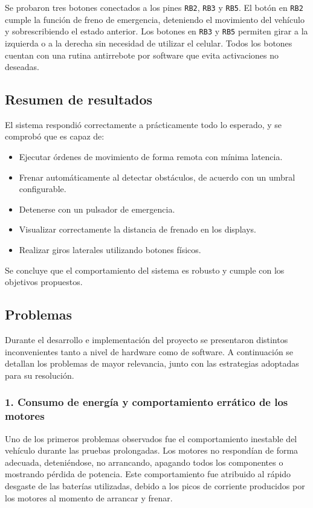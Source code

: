 \documentclass[]{article}
\begin{document}
	Se probaron tres botones conectados a los pines \texttt{RB2}, \texttt{RB3} y \texttt{RB5}. El botón en \texttt{RB2} cumple la función de freno de emergencia, deteniendo el movimiento del vehículo y sobrescribiendo el estado anterior. Los botones en \texttt{RB3} y \texttt{RB5} permiten girar a la izquierda o a la derecha sin necesidad de utilizar el celular. Todos los botones cuentan con una rutina antirrebote por software que evita activaciones no deseadas.
	
	\subsection{Resumen de resultados}
	
	El sistema respondió correctamente a prácticamente todo lo esperado, y se comprobó que es capaz de:
	
	\begin{itemize}
		\item Ejecutar órdenes de movimiento de forma remota con mínima latencia.
		\item Frenar automáticamente al detectar obstáculos, de acuerdo con un umbral configurable.
		\item Detenerse con un pulsador de emergencia.
		\item Visualizar correctamente la distancia de frenado en los displays.
		\item Realizar giros laterales utilizando botones físicos.
	\end{itemize}
	
	Se concluye que el comportamiento del sistema es robusto y cumple con los objetivos propuestos.
	
	\subsection{Problemas}
	
	Durante el desarrollo e implementación del proyecto se presentaron distintos inconvenientes tanto a nivel de hardware como de software. A continuación se detallan los problemas de mayor relevancia, junto con las estrategias adoptadas para su resolución.
	
	\subsubsection{1. Consumo de energía y comportamiento errático de los motores}
	
	Uno de los primeros problemas observados fue el comportamiento inestable del vehículo durante las pruebas prolongadas. Los motores no respondían de forma adecuada, deteniéndose, no arrancando, apagando todos los componentes o mostrando pérdida de potencia. Este comportamiento fue atribuido al rápido desgaste de las baterías utilizadas, debido a los picos de corriente producidos por los motores al momento de arrancar y frenar.
	
\end{document}
